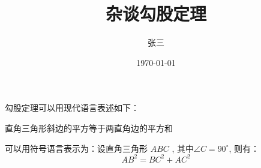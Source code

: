 \documentclass{article}
\title{\heiti 杂谈勾股定理}
\author{\kaishu 张三 }
\date{\today}
\newcommand\degree{^\circ}
\begin{document}
    \maketitle

    勾股定理可以用现代语言表述如下：

    直角三角形斜边的平方等于两直角边的平方和
    
    可以用符号语言表示为：设直角三角形 $ABC$ , 其中$\angle C = 90 \degree$, 则有：
    \begin{equation}
        AB^2 = BC^2+ AC^2
    \end{equation}
\end{document}
